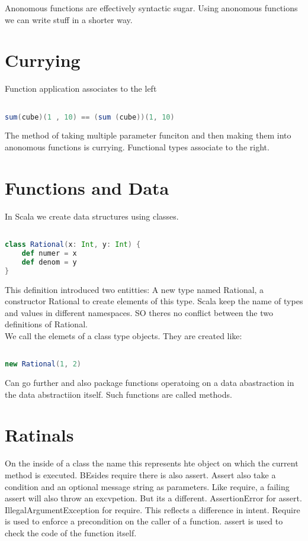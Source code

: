 \documentclass[10pt, a4paper]{report}
\begin{document}
Anonomous functions are effectively syntactic sugar. Using anonomous functions we can write stuff in a shorter way.

\section{Currying}

Function application associates to the left

\begin{lstlisting}[language=scala]

sum(cube)(1 , 10) == (sum (cube))(1, 10)

\end{lstlisting}

The method of taking multiple parameter funciton and then making them into anonomous functions is currying. Functional types associate to the right.

\section{Functions and Data}

In Scala we create data structures using classes.
\begin{lstlisting}[language=scala]

class Rational(x: Int, y: Int) {
	def numer = x
	def denom = y
}
\end{lstlisting}

This definition introduced two entitties: A new type named Rational, a constructor Rational to create elements of this type. Scala keep the name of types and values in different namespaces. SO theres no conflict between the two definitions of Rational.\\ We call the elemets of a class type objects. They are created like:
\begin{lstlisting}[language=scala]

new Rational(1, 2)

\end{lstlisting}

Can go further and also package functions operatoing on a data abastraction in the data abstractiion itself. Such functions are called methods.


\section{Ratinals}
On the inside of a class the name this represents hte object on which the current method is executed. BEsides require there is also assert. Assert also take a condition and an optional message string as parameters. Like require, a failing assert will also throw an excvpetion. But its a different. AssertionError for assert. IllegalArgumentException for require. This reflects a difference in intent.  Require is used to enforce a precondition on the caller of a function. assert is used to check the code of the function itself.\\
\end{document}
